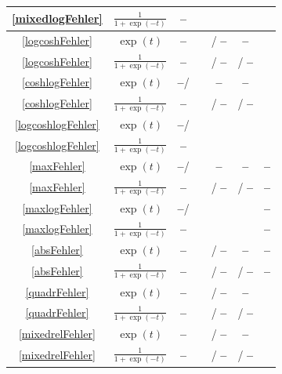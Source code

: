 \documentclass[10pt]{article}
\newcommand{\xmark}{\textbf{--}}
\begin{document}
{\begin{longtable}[c]{|c|c||c|c|c|c|c|}
		\eqref{mixedlogFehler}& $\frac{1}{1+\exp(-t)}$ &\xmark &\checkmark & \checkmark & \checkmark & \checkmark\\
		\hline
		\eqref{logcoshFehler} & $\exp(t)$ & \xmark &\checkmark & \checkmark / \xmark & \xmark & \checkmark \\
		\eqref{logcoshFehler} & $\frac{1}{1+\exp(-t)}$ & \xmark & \checkmark & \checkmark / \xmark & \checkmark / \xmark & \checkmark \\
		\hline
		\eqref{coshlogFehler} & $\exp(t)$ & \xmark / \checkmark & \checkmark & \xmark & \xmark & \checkmark \\
		\eqref{coshlogFehler} &$\frac{1}{1+\exp(-t)}$ & \xmark & \checkmark & \checkmark / \xmark & \checkmark / \xmark & \checkmark\\
		\hline
		\eqref{logcoshlogFehler} & $\exp(t)$ & \xmark / \checkmark & \checkmark & \checkmark & \checkmark & \checkmark \\
		\eqref{logcoshlogFehler} & $\frac{1}{1+\exp(-t)}$ &\xmark & \checkmark & \checkmark & \checkmark & \checkmark\\
		\hline
		\eqref{maxFehler}  & $\exp(t)$ & \xmark / \checkmark & \checkmark& \xmark & \xmark & \xmark \\
		\eqref{maxFehler} &$\frac{1}{1+\exp(-t)}$ & \xmark & \checkmark & \checkmark / \xmark & \checkmark / \xmark & \xmark \\
		\hline
		\eqref{maxlogFehler} & $\exp(t)$ & \xmark / \checkmark & \checkmark & \checkmark & \checkmark & \xmark \\
		\eqref{maxlogFehler} & $\frac{1}{1+\exp(-t)}$ & \xmark & \checkmark & \checkmark & \checkmark & \xmark \\			
		\hline
		\eqref{absFehler}  & $\exp(t)$ &\xmark & \checkmark & \checkmark / \xmark & \xmark & \xmark \\
		\eqref{absFehler} &$\frac{1}{1+\exp(-t)}$ &\xmark & \checkmark & \checkmark / \xmark & \checkmark / \xmark & \xmark \\
		\hline
		\eqref{quadrFehler} & $\exp(t)$ &\xmark & \checkmark & \checkmark / \xmark & \xmark & \checkmark \\
		\eqref{quadrFehler} &$\frac{1}{1+\exp(-t)}$ &\xmark & \checkmark & \checkmark / \xmark & \checkmark / \xmark & \checkmark\\
		\hline
		\eqref{mixedrelFehler} & $\exp(t)$ & \xmark & \checkmark & \checkmark / \xmark & \xmark & \checkmark \\
		\eqref{mixedrelFehler} & $\frac{1}{1+\exp(-t)}$ &\xmark & \checkmark & \checkmark / \xmark & \checkmark / \xmark & \checkmark\\

\end{longtable}}
\end{document}
